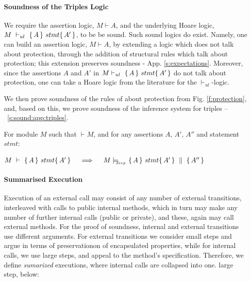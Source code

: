 
\paragraph{Soundness of the Triples Logic}
\label{sect:prove:triples:sound}

We require the assertion logic,  $M\vdash A$, and  the  underlying Hoare logic,  $M\ \vdash_{ul}\  \triple A {stmt} {A'}$,   to be be  sound. 
Such  sound logics do exist.
Namely, one can build an assertion logic, $M\vdash A$, by extending a logic which does not talk about protection, through the addition of structural rules which talk about protection; this extension preserves soundness - \cf  App. \ref{s:expectations}. 
Moreover,  since the assertions $A$ and $A'$ in $M \vdash_{ul}\   \{\, A \, \}\ stmt \{\, A' \, \}$ do not talk about protection, 
one can take   a Hoare logic from the literature for the $ \vdash_{ul}$-logic.

We then prove   soundness of the rules of about protection from Fig. \ref{f:protection}, and, based on this, 
we prove soundness of the inference system for triples  -- \cf \A\ \ref{s:sound:app:triples}.

 

\begin{Theorem}
\label{l:triples:sound}
For module  $M$   such that  $\vdash M$, and for any assertions $A$,  $A'$, $A''$ and statement  $stmt$:
\begin{center}
$M\ \vdash\  \triple A {stmt} {A'}  \ \ \ \  \Longrightarrow  \ \ \ \ \satisfiesD {M} {\quadruple {A} {stmt} {A'} {A''}}$
\end{center}
\end{Theorem}
 

\paragraph{Summarised Execution}
\label{s:summaized}

Execution of an external call may consist of any number of external
transitions, interleaved with calls to public internal methods, which in
turn may make any number of further internal calls (public or private),  %
and these, again may call external methods.
For the   proof of soundness,  internal and external transitions use different arguments.
 For  external transitions we consider small steps  and  argue in terms of  preservationon of  encapsulated properties,
while for internal calls, we use large steps, and appeal to the method's specification.
Therefore, we define  \emph{sumarized} executions, where  internal calls are collapsed into one. large step, \eg below:
  


